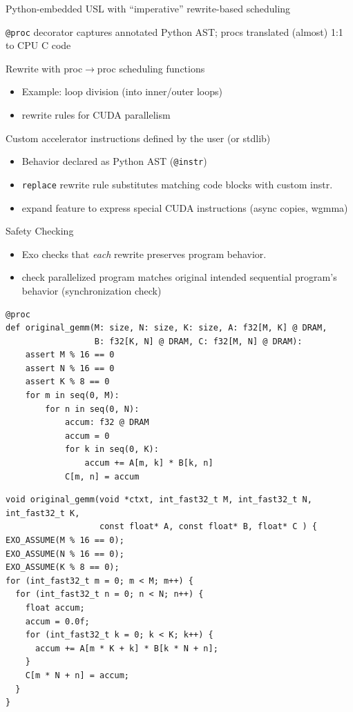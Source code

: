 \begin{minipage}[t]{0.5\textwidth}\fixminipage
{} Python-embedded USL with ``imperative'' rewrite-based scheduling

\texttt{@proc} decorator captures annotated Python AST; procs translated (almost) 1:1 to CPU C code

Rewrite with proc$\to$proc scheduling functions
\begin{itemize}
  \item Example: loop division (into inner/outer loops)
  \item {} rewrite rules for CUDA parallelism
\end{itemize}
Custom accelerator instructions defined by the user (or stdlib)
\begin{itemize}
  \item Behavior declared as Python AST (\texttt{@instr})
  \item \texttt{replace} rewrite rule substitutes matching code blocks with custom instr.
  \item {} expand feature to express special CUDA instructions (async copies, wgmma)
\end{itemize}
Safety Checking
\begin{itemize}
  \item Exo checks that \textit{each} rewrite preserves program behavior.
  \item {} check parallelized program matches original intended sequential program's behavior (synchronization check)
\end{itemize}
\end{minipage} %
\hfill
\begin{minipage}[t]{0.5\textwidth}\fixminipage
{}
\vspace{3mm}
{
\tiny
\begin{verbatim}
@proc
def original_gemm(M: size, N: size, K: size, A: f32[M, K] @ DRAM,
                  B: f32[K, N] @ DRAM, C: f32[M, N] @ DRAM):
    assert M % 16 == 0
    assert N % 16 == 0
    assert K % 8 == 0
    for m in seq(0, M):
        for n in seq(0, N):
            accum: f32 @ DRAM
            accum = 0
            for k in seq(0, K):
                accum += A[m, k] * B[k, n]
            C[m, n] = accum
\end{verbatim}
}
\vspace{1cm}
\vspace{3mm}
{
\tiny
\begin{verbatim}
void original_gemm(void *ctxt, int_fast32_t M, int_fast32_t N, int_fast32_t K,
                   const float* A, const float* B, float* C ) {
EXO_ASSUME(M % 16 == 0);
EXO_ASSUME(N % 16 == 0);
EXO_ASSUME(K % 8 == 0);
for (int_fast32_t m = 0; m < M; m++) {
  for (int_fast32_t n = 0; n < N; n++) {
    float accum;
    accum = 0.0f;
    for (int_fast32_t k = 0; k < K; k++) {
      accum += A[m * K + k] * B[k * N + n];
    }
    C[m * N + n] = accum;
  }
}
\end{verbatim}
}
\end{minipage} %
\vfill
\newpage
{}

